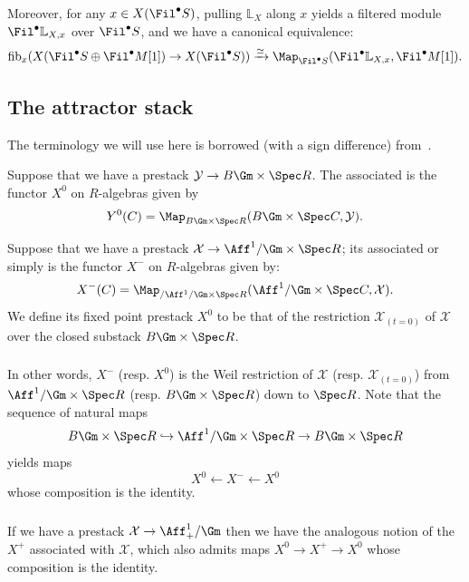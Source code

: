 \documentclass[10pt]{amsart}
\begin{document}
Moreover, for any $x\in X(\Fil^\bullet S)$, pulling $\mathbb{L}_X$ along $x$ yields a filtered module $\Fil^\bullet \mathbb{L}_{X,x}$ over $\Fil^\bullet S$, and we have a canonical equivalence:
\[
\mathrm{fib}_x(X(\Fil^\bullet S\oplus \Fil^\bullet M[1])\to X(\Fil^\bullet S))\xrightarrow{\simeq}\Map_{\Fil^\bullet S}(\Fil^\bullet \mathbb{L}_{X,x},\Fil^\bullet M[1]).
\]

\subsection{The attractor stack}
\label{subsec:attractor_stacks}

The terminology we will use here is borrowed (with a sign difference) from~\cite{drinfeld2015algebraic}.

\begin{definition}
Suppose that we have a prestack $\mathcal{Y}\to B\Gm\times\Spec R$. The associated  is the functor $X^0$ on $R$-algebras given by
\[
Y^0(C) =  \Map_{B\Gm\times \Spec R}(B\Gm \times \Spec C,\mathcal{Y}).
\]
 \end{definition} 

\begin{definition}
Suppose that we have a prestack $\mathcal{X}\to \Aff^1/\Gm\times \Spec R$; its associated  or simply  is the functor $X^-$ on $R$-algebras given by:
\[
X^-(C) = \Map_{/\Aff^1/\Gm\times \Spec R}(\Aff^1/\Gm \times \Spec C,\mathcal{X}).
\]
We define its fixed point prestack $X^0$ to be that of the restriction $\mathcal{X}_{(t=0)}$ of $\mathcal{X}$ over the closed substack $B\Gm\times\Spec R$. 
\end{definition}


\subsubsection{}
In other words, $X^-$ (resp. $X^0$) is the Weil restriction of $\mathcal{X}$ (resp. $\mathcal{X}_{(t=0)}$) from $\Aff^1/\Gm\times \Spec R$ (resp. $B\Gm\times \Spec R$) down to $\Spec R$. Note that the sequence of natural maps
\[
B\Gm\times\Spec R \hookrightarrow \Aff^1/\Gm\times \Spec R \to B\Gm\times\Spec R
\]
yields maps
\[
X^0\leftarrow X^-\leftarrow X^0
\]
whose composition is the identity.

\subsubsection{}
If we have a prestack $\mathcal{X}\to \Aff^1_+/\Gm$ then we have the analogous notion of the  $X^+$ associated with $\mathcal{X}$, which also admits maps $X^0\to X^+\to X^0$ whose composition is the identity.
\end{document}

